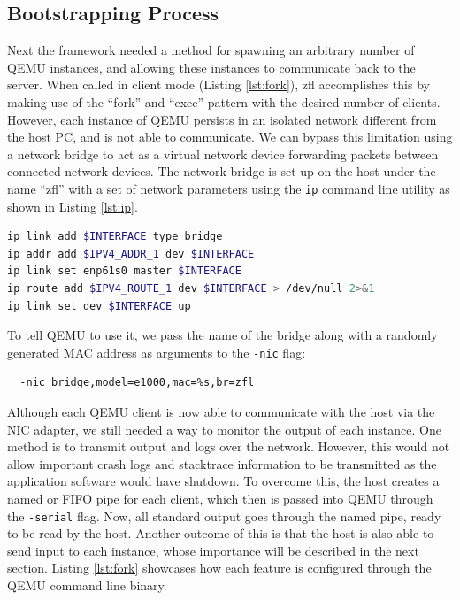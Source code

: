 \documentclass[12pt]{article}
\begin{document}
\subsection{Bootstrapping Process}
Next the framework needed a method for spawning an arbitrary number of QEMU instances, and allowing
these instances to communicate back to the server. When called in client mode (Listing
\ref{lst:fork}), zfl accomplishes this
by making use of the ``fork'' and ``exec'' pattern with the desired number of clients. \\

However, each instance of QEMU persists in an isolated network different from the host PC,
and is not able to communicate. We can bypass this limitation using a network bridge to act as a
virtual network device forwarding packets between connected network devices.
The network bridge is set up on the host under the name ``zfl'' with a set of network parameters using
the \verb|ip| command line utility as shown in Listing \ref{lst:ip}.
\begin{lstlisting}[language=bash,caption=Network bridge setup,label={lst:ip}]
ip link add $INTERFACE type bridge
ip addr add $IPV4_ADDR_1 dev $INTERFACE
ip link set enp61s0 master $INTERFACE
ip route add $IPV4_ROUTE_1 dev $INTERFACE > /dev/null 2>&1
ip link set dev $INTERFACE up
\end{lstlisting}
To tell QEMU to use it, we pass the name of the bridge along
with a randomly generated MAC address as arguments to the \verb|-nic| flag:
\begin{verbatim}
  -nic bridge,model=e1000,mac=%s,br=zfl
\end{verbatim}

Although each QEMU client is now able to communicate with the host via the NIC adapter, we still
needed a way to monitor the output of each instance. One method is to transmit
output and logs over the network. However, this would not allow important crash logs and stacktrace
information to be transmitted as the application software would have shutdown. To overcome this, the host
creates a named or FIFO pipe for each client, which then is passed into
QEMU through the \verb|-serial| flag. Now, all standard output goes through the named pipe, ready to be read
by the host. Another outcome of this is that the host is also able to send input to each
instance, whose importance will be described in the next section. Listing \ref{lst:fork} showcases
how each feature is configured through the QEMU command line binary.
\end{document}
